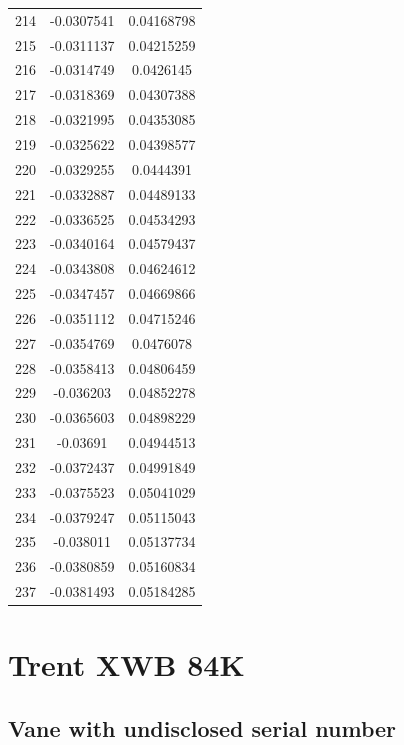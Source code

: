 \documentclass[a4paper, 11pt, oneside]{report}
\begin{document}
{\begin{longtable}{|c|c|c|}
214 & -0.0307541 & 0.04168798 \\
215 & -0.0311137 & 0.04215259 \\
216 & -0.0314749 & 0.0426145  \\
217 & -0.0318369 & 0.04307388 \\
218 & -0.0321995 & 0.04353085 \\
219 & -0.0325622 & 0.04398577 \\
220 & -0.0329255 & 0.0444391  \\
221 & -0.0332887 & 0.04489133 \\
222 & -0.0336525 & 0.04534293 \\
223 & -0.0340164 & 0.04579437 \\
224 & -0.0343808 & 0.04624612 \\
225 & -0.0347457 & 0.04669866 \\
226 & -0.0351112 & 0.04715246 \\
227 & -0.0354769 & 0.0476078  \\
228 & -0.0358413 & 0.04806459 \\
229 & -0.036203  & 0.04852278 \\
230 & -0.0365603 & 0.04898229 \\
231 & -0.03691   & 0.04944513 \\
232 & -0.0372437 & 0.04991849 \\
233 & -0.0375523 & 0.05041029 \\
234 & -0.0379247 & 0.05115043 \\
235 & -0.038011  & 0.05137734 \\
236 & -0.0380859 & 0.05160834 \\
237 & -0.0381493 & 0.05184285 \\
\hline
\end{longtable}
\unskip
\unpenalty
\unpenalty}

\begin{multicols}{2}
\unvbox\ltmcbox
\end{multicols}

\section{Trent XWB 84K}

\subsection{Vane with undisclosed serial number}
\end{document}
